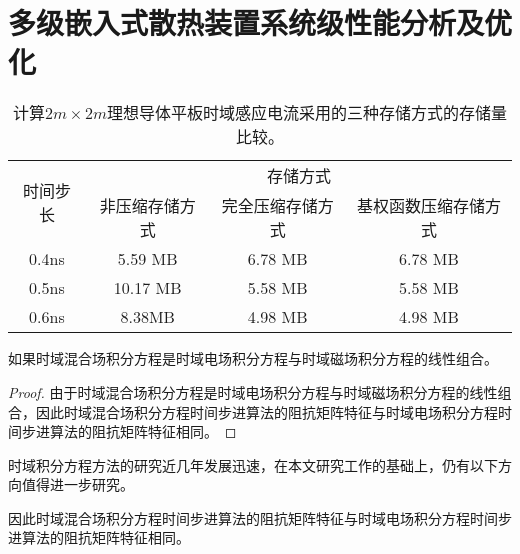 
\chapter{多级嵌入式散热装置系统级性能分析及优化}

\begin{table}[h]
    \caption{计算$2m\times 2m$理想导体平板时域感应电流采用的三种存储方式的存储量比较。}
    \begin{tabular}{cccc}
        \toprule
        \multirow{2}{*}{时间步长} & \multicolumn{3}{c}{存储方式} \\
        \cmidrule{2-4}
        & 非压缩存储方式 & 完全压缩存储方式 & 基权函数压缩存储方式 \\
        \midrule
        0.4ns & 5.59 MB & 6.78 MB & 6.78 MB\\
        0.5ns & 10.17 MB & 5.58 MB & 5.58 MB \\
        0.6ns & 8.38MB & 4.98 MB & 4.98 MB \\
        \bottomrule
        \end{tabular}
    \label{tablea}
    \end{table}

\begin{theorem}
如果时域混合场积分方程是时域电场积分方程与时域磁场积分方程的线性组合。
\end{theorem}
\begin{proof}
由于时域混合场积分方程是时域电场积分方程与时域磁场积分方程的线性组合，因此时域混合场积分方程时间步进算法的阻抗矩阵特征与时域电场积分方程时间步进算法的阻抗矩阵特征相同。
\end{proof}
\begin{corollary}
时域积分方程方法的研究近几年发展迅速，在本文研究工作的基础上，仍有以下方向值得进一步研究。
\end{corollary}
\begin{lemma}
因此时域混合场积分方程时间步进算法的阻抗矩阵特征与时域电场积分方程时间步进算法的阻抗矩阵特征相同。
\end{lemma}